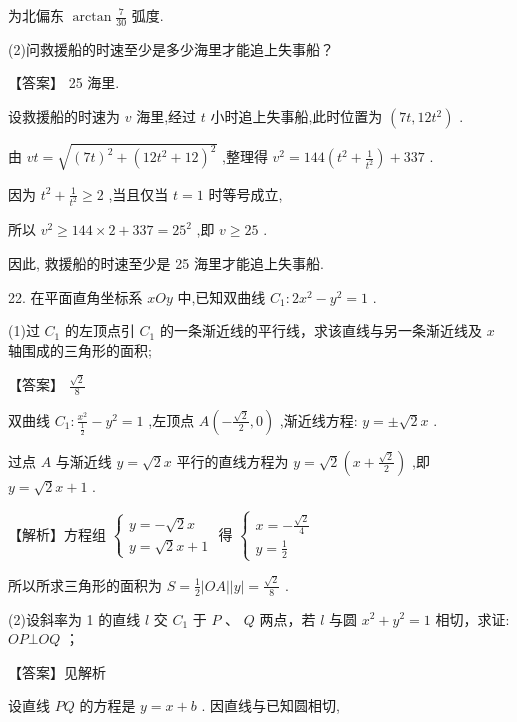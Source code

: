 \documentclass[10pt]{article}
\begin{document}
为北偏东 \(\arctan \frac{7}{30}\) 弧度.

(2)问救援船的时速至少是多少海里才能追上失事船？

【答案】 25 海里.

设救援船的时速为 \(v\) 海里,经过 \(t\) 小时追上失事船,此时位置为 \(\left( {{7t},{12}{t}^{2}}\right)\) .

由 \({vt} = \sqrt{{\left( 7t\right) }^{2} + {\left( {12}{t}^{2} + {12}\right) }^{2}}\) ,整理得 \({v}^{2} = {144}\left( {{t}^{2} + \frac{1}{{t}^{2}}}\right)  + {337}\) .

因为 \({t}^{2} + \frac{1}{{t}^{2}} \geq  2\) ,当且仅当 \(t = 1\) 时等号成立,

所以 \({v}^{2} \geq  {144} \times  2 + {337} = {25}^{2}\) ,即 \(v \geq  {25}\) .

因此, 救援船的时速至少是 25 海里才能追上失事船.

22. 在平面直角坐标系 \({xOy}\) 中,已知双曲线 \({C}_{1} : 2{x}^{2} - {y}^{2} = 1\) .

(1)过 \({C}_{1}\) 的左顶点引 \({C}_{1}\) 的一条渐近线的平行线，求该直线与另一条渐近线及 \(x\) 轴围成的三角形的面积;

【答案】 \(\frac{\sqrt{2}}{8}\)

双曲线 \({C}_{1} : \frac{{x}^{2}}{\frac{1}{2}} - {y}^{2} = 1\) ,左顶点 \(A\left( {-\frac{\sqrt{2}}{2},0}\right)\) ,渐近线方程: \(y =  \pm  \sqrt{2}x\) .

过点 \(A\) 与渐近线 \(y = \sqrt{2}x\) 平行的直线方程为 \(y = \sqrt{2}\left( {x + \frac{\sqrt{2}}{2}}\right)\) ,即 \(y = \sqrt{2}x + 1\) .

【解析】方程组 \(\left\{  \begin{array}{l} y =  - \sqrt{2}x \\  y = \sqrt{2}x + 1 \end{array}\right.\) 得 \(\left\{  \begin{array}{l} x =  - \frac{\sqrt{2}}{4} \\  y = \frac{1}{2} \end{array}\right.\)

所以所求三角形的面积为 \(S = \frac{1}{2}\left| {OA}\right| \left| y\right|  = \frac{\sqrt{2}}{8}\) .

(2)设斜率为 1 的直线 \(l\) 交 \({C}_{1}\) 于 \(P\text{ 、 }Q\) 两点，若 \(l\) 与圆 \({x}^{2} + {y}^{2} = 1\) 相切，求证: \({OP}\bot {OQ}\) ；

【答案】见解析

设直线 \({PQ}\) 的方程是 \(y = x + b\) . 因直线与已知圆相切,
\end{document}

